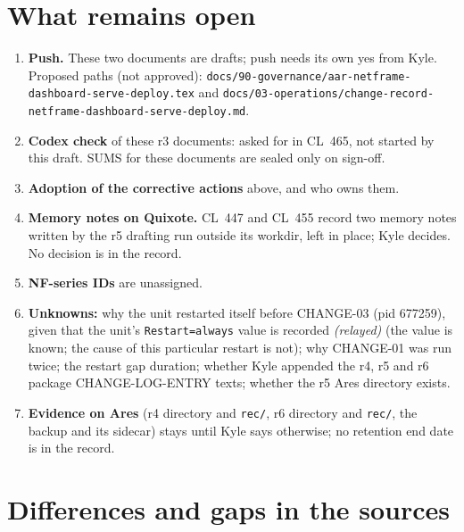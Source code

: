 \documentclass[10pt]{article}
\newcommand{\CL}[1]{CL~#1}
\newcommand{\relay}{\textit{(relayed)}}
\begin{document}
\section{What remains open}

\begin{enumerate}[leftmargin=1.5em,itemsep=0.1em]
\item \textbf{Push.} These two documents are drafts; push needs its own yes from Kyle. Proposed paths (not approved): \texttt{docs/90-governance/aar-netframe-dashboard-serve-deploy.tex} and \texttt{docs/03-operations/change-record-netframe-dashboard-serve-deploy.md}.
\item \textbf{Codex check} of these r3 documents: asked for in \CL{465}, not started by this draft. SUMS for these documents are sealed only on sign-off.
\item \textbf{Adoption of the corrective actions} above, and who owns them.
\item \textbf{Memory notes on Quixote.} \CL{447} and \CL{455} record two memory notes written by the r5 drafting run outside its workdir, left in place; Kyle decides. No decision is in the record.
\item \textbf{NF-series IDs} are unassigned.
\item \textbf{Unknowns:} why the unit restarted itself before CHANGE-03 (pid 677259), given that the unit's \texttt{Restart=always} value is recorded \relay{} (the value is known; the cause of this particular restart is not); why CHANGE-01 was run twice; the restart gap duration; whether Kyle appended the r4, r5 and r6 package CHANGE-LOG-ENTRY texts; whether the r5 Ares directory exists.
\item \textbf{Evidence on Ares} (r4 directory and \texttt{rec/}, r6 directory and \texttt{rec/}, the backup and its sidecar) stays until Kyle says otherwise; no retention end date is in the record.
\end{enumerate}

\section{Differences and gaps in the sources}
\end{document}
